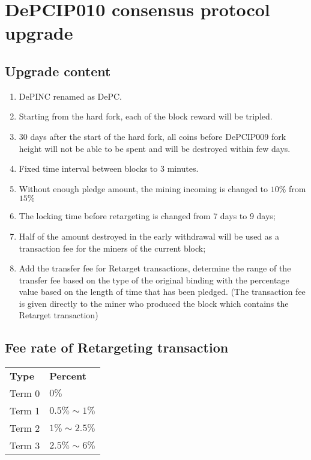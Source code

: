 \chapter{DePCIP010 consensus protocol upgrade}
\section{Upgrade content}
\begin{flushleft}
    \begin{enumerate}
        \item DePINC renamed as DePC.
        \item Starting from the hard fork, each of the block reward will be tripled.
        \item 30 days after the start of the hard fork, all coins before DePCIP009 fork height will not be able to be spent and will be destroyed within few days.
        \item Fixed time interval between blocks to 3 minutes.
        \item Without enough pledge amount, the mining incoming is changed to $10\%$ from $15\%$
        \item The locking time before retargeting is changed from 7 days to 9 days;
        \item Half of the amount destroyed in the early withdrawal will be used as a transaction fee for the miners of the current block;
        \item Add the transfer fee for Retarget transactions, determine the range of the transfer fee based on the type of the original binding with the percentage value based on the length of time that has been pledged. (The transaction fee is given directly to the miner who produced the block which contains the Retarget transaction)
    \end{enumerate}
\end{flushleft}
\section{Fee rate of Retargeting transaction}
\begin{tabular}{ p{4cm} p{8cm} }
    \hline
    \textbf{Type}                  & \textbf{Percent}     \\[5pt]
    \rowcolor{lightgray!30}Term 0  & $0\%$                \\[5pt]
    Term 1                         & $0.5\%\sim1\%$       \\[5pt]
    \rowcolor{lightgray!30}Term 2  & $1\%\sim2.5\%$       \\[5pt]
    Term 3                         & $2.5\%\sim6\%$       \\[5pt]
    \hline
\end{tabular}

